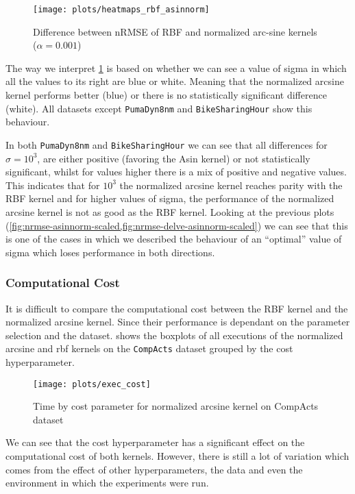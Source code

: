 \begin{figure}[H]
    \texttt{[image: plots/heatmaps\_rbf\_asinnorm]}
    \caption{Difference between nRMSE of RBF and normalized arc-sine kernels ($\alpha=0.001$)}
    \label{fig:paired-ttest-rbf-asinnorm-diff}
\end{figure}

The way we interpret \cref{fig:paired-ttest-rbf-asinnorm-diff} is based on whether
we can see a value of sigma in which all the values to its right are blue or white.
Meaning that the normalized arcsine kernel performs better (blue) or there is no
statistically significant difference (white). All datasets except
\texttt{PumaDyn8nm} and \texttt{BikeSharingHour} show this behaviour.

In both \texttt{PumaDyn8nm} and \texttt{BikeSharingHour} we can see that all
differences for $\sigma=10^3$, are either positive (favoring the Asin kernel) or
not statistically significant, whilst for values higher there is a mix of positive
and negative values. This indicates that for $10^3$ the normalized arcsine kernel
reaches parity with the RBF kernel and for higher values of sigma, the performance
of the normalized arcsine kernel is not as good as the RBF kernel. Looking
at the previous plots (\cref{fig:nrmse-asinnorm-scaled,fig:nrmse-delve-asinnorm-scaled})
we can see that this is one of the cases in which we described the behaviour of
an ``optimal'' value of sigma which loses performance in both directions.

\subsubsection{Computational Cost}

It is difficult to compare the computational cost between the RBF kernel
and the normalized arcsine kernel. Since their performance is dependant
on the parameter selection and the dataset. 
shows the boxplots of all executions of the normalized arcsine and rbf kernels
on the \texttt{CompActs} dataset grouped by the cost hyperparameter.

\begin{figure}[H]
    \texttt{[image: plots/exec\_cost]}
    \caption{Time by cost parameter for normalized arcsine kernel on CompActs dataset}
    \label{fig:time-asinnorm-scaled-compacts}
\end{figure}

We can see that the cost hyperparameter has a significant effect on the
computational cost of both kernels. However, there is still a lot of variation
which comes from the effect of other hyperparameters, the data and even the
environment in which the experiments were run.

